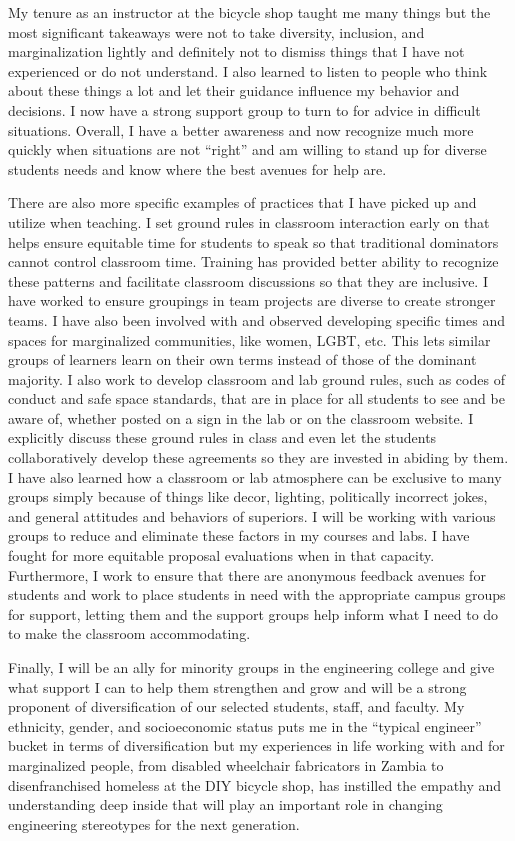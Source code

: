 \documentclass[titlepage]{article}
\begin{document}
My tenure as an instructor at the bicycle shop taught me many things but the
most significant takeaways were not to take diversity, inclusion, and
marginalization lightly and definitely not to dismiss things that I have not
experienced or do not understand. I also learned to listen to people who think
about these things a lot and let their guidance influence my behavior and
decisions. I now have a strong support group to turn to for advice in difficult
situations. Overall, I have a better awareness and now recognize much more
quickly when situations are not ``right'' and am willing to stand up for
diverse students needs and know where the best avenues for help are.

There are also more specific examples of practices that I have picked up and
utilize when teaching. I set ground rules in classroom interaction early on
that helps ensure equitable time for students to speak so that traditional
dominators cannot control classroom time. Training has provided better ability
to recognize these patterns and facilitate classroom discussions so that they
are inclusive. I have worked to ensure groupings in team projects are diverse
to create stronger teams. I have also been involved with and observed
developing specific times and spaces for marginalized communities, like women,
LGBT, etc. This lets similar groups of learners learn on their own terms
instead of those of the dominant majority. I also work to develop classroom and
lab ground rules, such as codes of conduct and safe space standards, that are
in place for all students to see and be aware of, whether posted on a sign in
the lab or on the classroom website. I explicitly discuss these ground rules in
class and even let the students collaboratively develop these agreements so
they are invested in abiding by them. I have also learned how a classroom or
lab atmosphere can be exclusive to many groups simply because of things like
decor, lighting, politically incorrect jokes, and general attitudes and
behaviors of superiors.  I will be working with various groups to reduce and
eliminate these factors in my courses and labs. I have fought for more
equitable proposal evaluations when in that capacity. Furthermore, I work to
ensure that there are anonymous feedback avenues for students and work to place
students in need with the appropriate campus groups for support, letting them
and the support groups help inform what I need to do to make the classroom
accommodating.

Finally, I will be an ally for minority groups in the engineering college and
give what support I can to help them strengthen and grow and will be a strong
proponent of diversification of our selected students, staff, and faculty. My
ethnicity, gender, and socioeconomic status puts me in the ``typical engineer''
bucket in terms of diversification but my experiences in life working with and
for marginalized people, from disabled wheelchair fabricators in Zambia to
disenfranchised homeless at the DIY bicycle shop, has instilled the empathy and
understanding deep inside that will play an important role in changing
engineering stereotypes for the next generation.
\end{document}
